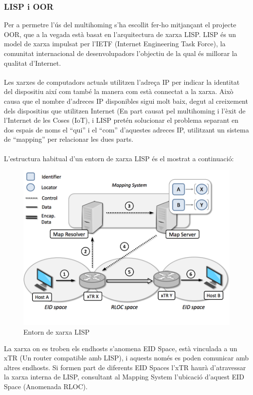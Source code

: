 \documentclass[11pt]{article}
\begin{document}
\subsubsection{LISP i OOR}
Per a permetre l’ús del multihoming s’ha escollit fer-ho mitjançant el projecte OOR, que a la vegada està basat en l’arquitectura de xarxa LISP.
LISP és un model de xarxa impulsat per l’IETF (Internet Engineering Task Force), la comunitat internacional de desenvolupadors l’objectiu de la qual és millorar la qualitat d’Internet. \\
\\
Les xarxes de computadors actuals utilitzen l’adreça IP per indicar la identitat del dispositiu així com també la manera com està connectat a la xarxa. Això causa que el nombre d’adreces IP disponibles sigui molt baix, degut al creixement dels dispositius que utilitzen Internet (En part causat pel multihoming i l’èxit de l’Internet de les Coses (IoT), i LISP pretén solucionar el problema separant en dos espais de noms el “qui” i el “com” d’aquestes adreces IP, utilitzant un sistema de “mapping” per  relacionar les dues parts.\\
\\
L’estructura habitual d’un entorn de xarxa LISP és el mostrat a continuació:
\begin{figure}[h]
	\centering
	\includegraphics[width=14cm]{lisp}
	\caption{Entorn de xarxa LISP}
\end{figure}
La xarxa on es troben els endhosts s’anomena EID Space, està vinculada a un xTR (Un router compatible amb LISP), i aquests només es poden comunicar amb altres endhosts. Si formen part de diferents EID Spaces l'xTR haurà d'atravessar la xarxa interna de LISP, consultant al Mapping System l'ubicació d'aquest EID Space (Anomenada RLOC)\cite{alberto15}.
\end{document}
